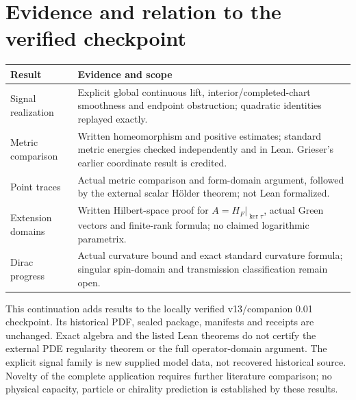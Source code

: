 \documentclass[11pt]{article}
\theoremstyle{remark}\newtheorem{remark}[theorem]{Remark}
\begin{document}
\section{Evidence and relation to the verified checkpoint}\label{sec:evidence}
\begin{center}\small
\begin{tabular}{p{.27\linewidth}p{.64\linewidth}}\toprule
Result & Evidence and scope\\\midrule
Signal realization & Explicit global continuous lift, interior/completed-chart smoothness and endpoint obstruction; quadratic identities replayed exactly.\\
Metric comparison & Written homeomorphism and positive estimates; standard metric energies checked independently and in Lean. Grieser's earlier coordinate result is credited.\\
Point traces & Actual metric comparison and form-domain argument, followed by the external scalar H\"older theorem; not Lean formalized.\\
Extension domains & Written Hilbert-space proof for $A=H_F|_{\ker\tau}$, actual Green vectors and finite-rank formula; no claimed logarithmic parametrix.\\
Dirac progress & Actual curvature bound and exact standard curvature formula; singular spin-domain and transmission classification remain open.\\\bottomrule
\end{tabular}
\end{center}
This continuation adds results to the locally verified v13/companion 0.01
checkpoint. Its historical PDF, sealed package, manifests and receipts are
unchanged. Exact algebra and the listed Lean theorems do not certify the
external PDE regularity theorem or the full operator-domain argument.
The explicit signal family is new supplied model data, not recovered
historical source. Novelty of the complete application requires further
literature comparison; no physical capacity, particle or chirality prediction
is established by these results.
\end{document}
